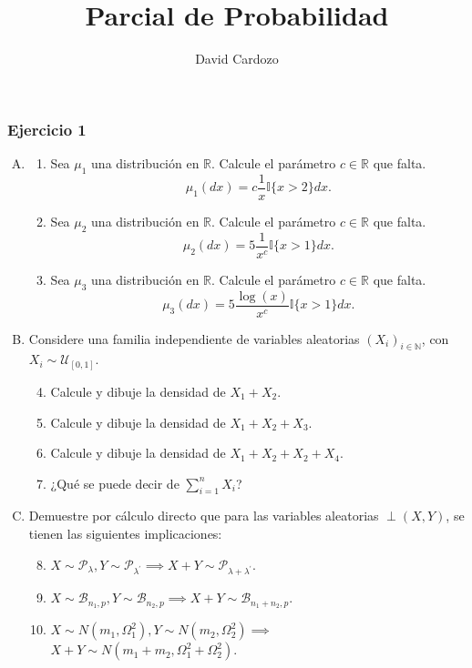 \documentclass[notitlepage]{article}
\author{David Cardozo}
\title{Parcial de Probabilidad}
\theoremstyle{definition}
\theoremstyle{remark}
\newcommand{\RR}{\mathbb{R}}
\newcommand{\R}{\mathbb{R}}
\newcommand{\N}{\mathbb{N}}
\begin{document}
	\maketitle
	\subsubsection*{Ejercicio 1}
	\begin{enumerate}[A)]
		\item \begin{enumerate}[1)]
			\item Sea $\mu_1$ una distribución en $\RR$. Calcule el parámetro $c \in \RR$ que falta.
			$$\mu_1(dx)= c \frac{1}{x}\mathbb{I}\{x>2 \}dx.$$
			\item Sea $\mu_2$ una distribución en $\R$. Calcule el parámetro $c \in \R$ que falta.
			$$\mu_2(dx)=5 \frac{1}{x^c}\mathbb{I}\{x>1 \}dx.$$
			\item Sea $\mu_3$ una distribución en $\R$. Calcule el parámetro $c \in \R$ que falta.
			$$\mu_3(dx)=5\frac{\log(x)}{x^c}\mathbb{I}\{x>1 \}dx.$$
			
		\end{enumerate}
		\item  Considere una familia independiente de variables aleatorias $(X_i)_{i\in \N}$, con $X_i\sim\mathcal{U}_{[0,1]}$.
		\begin{enumerate}[1)]
			\setcounter{enumii}{3}
			\item Calcule y dibuje la densidad de $X_1+X_2.$
			\item Calcule y dibuje la densidad de $X_1+X_2+X_3.$
			\item Calcule y dibuje la densidad de $X_1+X_2+X_2+X_4.$
			\item ¿Qué se puede decir de $\sum_{i=1}^{n}X_i$?
		\end{enumerate}
		\item Demuestre por cálculo directo que para las variables aleatorias $\perp(X,Y)$, se tienen las siguientes implicaciones:
		\begin{enumerate}[1)]
			\setcounter{enumii}{7}
			\item $X \sim \mathcal{P}_{\lambda}, Y \sim \mathcal{P}_{\lambda^{\prime}} \implies X+Y \sim \mathcal{P}_{\lambda+\lambda^\prime}.$
			\item $X \sim \mathcal{B}_{n_1,p}, Y \sim \mathcal{B}_{n_2,p} \implies X+Y \sim \mathcal{B}_{n_1+n_2,p}.$
			\item $X \sim N(m_1,\Omega_1^2), Y \sim N(m_2,\Omega_2^2)\implies$\\$ X+Y \sim N(m_1+m_2,\Omega_1^2+\Omega_2^2).$
		\end{enumerate} 
		
	\end{enumerate}	
	
\end{document}

